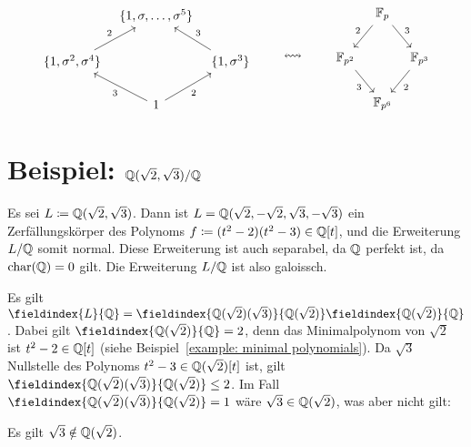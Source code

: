 \[
  \begin{tikzcd}[column sep = tiny]
      {}
    & \{1, \sigma, \dotsc, \sigma^5\}
    & {}
    \\
      \{1, \sigma^2, \sigma^4\}
      \arrow{ur}[above left]{2}
    & {}
    & \{1, \sigma^3\}
      \arrow{ul}[above right]{3}
    \\
      {}
    & 1
      \arrow{lu}[below left]{3}
      \arrow{ru}[below right]{2}
    & {}
  \end{tikzcd}
  \qquad\leftrightsquigarrow\qquad
    \begin{tikzcd}[column sep = tiny]
      {}
    & \Finite_p
      \arrow{dl}[above left]{2}
      \arrow{dr}[above right]{3}
    & {}
    \\
      \Finite_{p^2}
      \arrow{dr}[below left]{3}
    & {}
    & \Finite_{p^3}
      \arrow{dl}[below right]{2}
    \\
      {}
    & \Finite_{p^6}
    & {}
  \end{tikzcd}
\]






\section{Beispiel: \texorpdfstring{$\mathbb{Q}(\sqrt{2}, \sqrt{3})/\mathbb{Q}$}{Q(sqrt(2),sqrt(3))/Q}}

Es sei $L \coloneqq \mathbb{Q}(\sqrt{2}, \sqrt{3})$.
Dann ist $L = \mathbb{Q}(\sqrt{2}, -\sqrt{2}, \sqrt{3}, -\sqrt{3})$ ein Zerfällungskörper des Polynoms $f \coloneqq (t^2 - 2)(t^2 - 3) \in \mathbb{Q}[t]$, und die Erweiterung $L/\mathbb{Q}$ somit normal.
Diese Erweiterung ist auch separabel, da $\mathbb{Q}$ perfekt ist, da $\operatorname{char}(\mathbb{Q}) = 0$ gilt.
Die Erweiterung $L/\mathbb{Q}$ ist also galoissch.

Es gilt $\fieldindex{L}{\Rational} = \fieldindex{\Rational(\sqrt{2})(\sqrt{3})}{\Rational(\sqrt{2})} \fieldindex{\Rational(\sqrt{2})}{\Rational}$.
Dabei gilt $\fieldindex{\Rational(\sqrt{2})}{\Rational} = 2$, denn das Minimalpolynom von $\sqrt{2}$ ist $t^2 - 2 \in \mathbb{Q}[t]$ (siehe Beispiel~\ref{example: minimal polynomials}).
Da $\sqrt{3}$ Nullstelle des Polynoms $t^2 - 3 \in \mathbb{Q}(\sqrt{2})[t]$ ist, gilt $\fieldindex{\Rational(\sqrt{2})(\sqrt{3})}{\Rational(\sqrt{2})} \leq 2$.
Im Fall $\fieldindex{\Rational(\sqrt{2})(\sqrt{3})}{\Rational(\sqrt{2})} = 1$ wäre $\sqrt{3} \in \mathbb{Q}(\sqrt{2})$, was aber nicht gilt:

\begin{lemma}
  Es gilt $\sqrt{3} \notin \mathbb{Q}(\sqrt{2})$.
\end{lemma}

